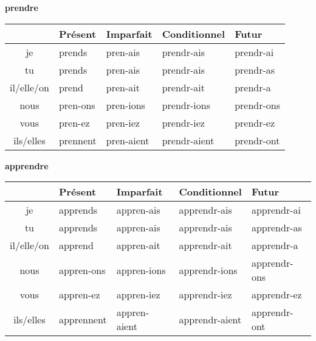 \renewcommand{\stemPresent}{pren}
\renewcommand{\stemFutur}{prendr}
\begin{center}
\textbf{prendre}
\vskip 0.1cm
\begin{tabular}{|c||L{3cm}|L{3cm}|L{3cm}|L{3cm}|}
\hline
& Pr\'esent & Imparfait & Conditionnel & Futur \\
\hline\hline
je           &	prends 	&	\stemPresent-ais	&	\stemFutur-ais	 &	\stemFutur-ai	\\
tu           &	prends	&	\stemPresent-ais	&	\stemFutur-ais	&	\stemFutur-as	\\
il/elle/on &	prend		&	\stemPresent-ait	&	\stemFutur-ait	&	\stemFutur-a	\\
nous      &	\stemPresent-ons	&	\stemPresent-ions	&	\stemFutur-ions	&	\stemFutur-ons	\\
vous      &	\stemPresent-ez	&	\stemPresent-iez	&	\stemFutur-iez		&	\stemFutur-ez	\\
ils/elles  &	prennent	&	\stemPresent-aient	&	\stemFutur-aient	&	\stemFutur-ont	\\
\hline
\end{tabular}
\end{center}

\renewcommand{\stemPresent}{appren}
\renewcommand{\stemFutur}{apprendr}
\begin{center}
\textbf{apprendre}
\vskip 0.1cm
\begin{tabular}{|c||L{3cm}|L{3cm}|L{3cm}|L{3cm}|}
\hline
& Pr\'esent & Imparfait & Conditionnel & Futur \\
\hline\hline
je           &	apprends 	&	\stemPresent-ais	&	\stemFutur-ais	 &	\stemFutur-ai	\\
tu           &	apprends	&	\stemPresent-ais	&	\stemFutur-ais	&	\stemFutur-as	\\
il/elle/on &	apprend		&	\stemPresent-ait	&	\stemFutur-ait	&	\stemFutur-a	\\
nous      &	\stemPresent-ons	&	\stemPresent-ions	&	\stemFutur-ions	&	\stemFutur-ons	\\
vous      &	\stemPresent-ez	&	\stemPresent-iez	&	\stemFutur-iez		&	\stemFutur-ez	\\
ils/elles  &	apprennent	&	\stemPresent-aient	&	\stemFutur-aient	&	\stemFutur-ont	\\
\hline
\end{tabular}
\end{center}

